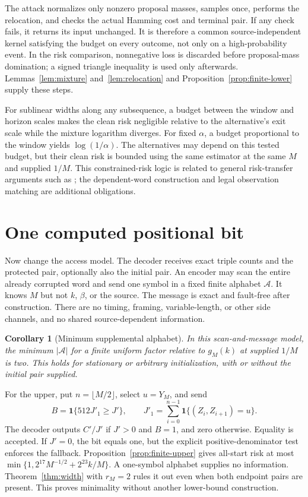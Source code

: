 \documentclass[11pt,letterpaper]{article}
\newcommand{\ind}{\mathbf 1}
\newtheorem{corollary}[theorem]{Corollary}
\theoremstyle{definition}
\theoremstyle{remark}
\numberwithin{equation}{section}
\begin{document}
The attack normalizes only nonzero proposal masses, samples once, performs the relocation, and checks the actual Hamming cost and terminal pair. If any check fails, it returns its input unchanged. It is therefore a common source-independent kernel satisfying the budget on every outcome, not only on a high-probability event. In the risk comparison, nonnegative loss is discarded before proposal-mass domination; a signed triangle inequality is used only afterwards. Lemmas~\ref{lem:mixture} and~\ref{lem:relocation} and Proposition~\ref{prop:finite-lower} supply these steps.

For sublinear widths along any subsequence, a budget between the window and horizon scales makes the clean risk negligible relative to the alternative's exit scale while the mixture logarithm diverges. For fixed $\alpha$, a budget proportional to the window yields $\log(1/\alpha)$. The alternatives may depend on this tested budget, but their clean risk is bounded using the same estimator at the same $M$ and supplied $1/M$. This constrained-risk logic is related to general risk-transfer arguments such as \citet{DuchiRuan2021}; the dependent-word construction and legal observation matching are additional obligations.

\section{One computed positional bit}\label{sec:bit}
Now change the access model. The decoder receives exact triple counts and the protected pair, optionally also the initial pair. An encoder may scan the entire already corrupted word and send one symbol in a fixed finite alphabet $\mathcal A$. It knows $M$ but not $k$, $\beta$, or the source. The message is exact and fault-free after construction. There are no timing, framing, variable-length, or other side channels, and no shared source-dependent information.

\begin{corollary}[Minimum supplemental alphabet]\label{cor:onebit}
In this scan-and-message model, the minimum $|\mathcal A|$ for a finite uniform factor relative to $g_M(k)$ at supplied $1/M$ is two. This holds for stationary or arbitrary initialization, with or without the initial pair supplied.
\end{corollary}
For the upper, put $n=\lfloor M/2\rfloor$, select $u=Y_M$, and send
\begin{equation}\label{eq:bit}
 B=\ind\{512J'_1\ge J'\},\qquad
 J'_1=\sum_{i=0}^{n-1}\ind\{(Z_i,Z_{i+1})=u\}.
\end{equation}
The decoder outputs $C'/J'$ if $J'>0$ and $B=1$, and zero otherwise. Equality is accepted. If $J'=0$, the bit equals one, but the explicit positive-denominator test enforces the fallback. Proposition~\ref{prop:finite-upper} gives all-start risk at most
$\min\{1,2^{17}M^{-1/2}+2^{23}k/M\}$.
A one-symbol alphabet supplies no information. Theorem~\ref{thm:width} with $r_M=2$ rules it out even when both endpoint pairs are present. This proves minimality without another lower-bound construction.
\end{document}

